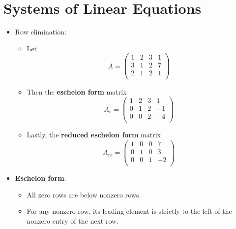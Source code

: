 \documentclass[../../notes.tex]{subfiles}
\begin{document}
\chapter{Systems of Linear Equations}
\begin{itemize}
    \item {}Row elimination:
    \begin{itemize}
        \item Let
        \begin{equation*}
            A =
            \begin{pmatrix}
                1 & 2 & 3 & 1\\
                3 & 1 & 2 & 7\\
                2 & 1 & 2 & 1\\
            \end{pmatrix}
        \end{equation*}
        \item Then the \textbf{eschelon form} matrix
        \begin{equation*}
            A_e =
            \begin{pmatrix}
                1 & 2 & 3 & 1\\
                0 & 1 & 2 & -1\\
                0 & 0 & 2 & -4\\
            \end{pmatrix}
        \end{equation*}
        \item Lastly, the \textbf{reduced eschelon form} matrix
        \begin{equation*}
            A_{re} =
            \begin{pmatrix}
                1 & 0 & 0 & 7\\
                0 & 1 & 0 & 3\\
                0 & 0 & 1 & -2\\
            \end{pmatrix}
        \end{equation*}
    \end{itemize}
    \item \textbf{Eschelon form}:
    \begin{itemize}
        \item All zero rows are below nonzero rows.
        \item For any nonzero row, its leading element is strictly to the left of the nonzero entry of the next row.
    \end{itemize}

\end{itemize}
\end{document}
